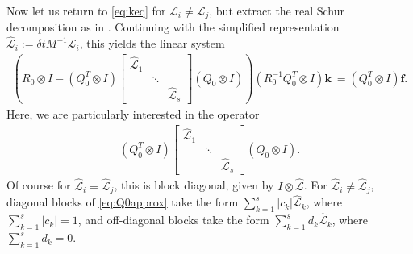 \documentclass[review]{siamart}
\begin{document}
Now let us return to \eqref{eq:keq} for $\mathcal{L}_i\neq\mathcal{L}_j$, but
extract the real Schur decomposition as in . Continuing
with the simplified representation $\widehat{\mathcal{L}}_i := \delta t M^{-1}\mathcal{L}_i$,
this yields the linear system
%
\begin{align}\label{eq:keq4}
\left( R_0\otimes I - (Q_0^T\otimes I) \begin{bmatrix}
	\widehat{\mathcal{L}}_1  & \\ & \ddots \\ && \widehat{\mathcal{L}}_s\end{bmatrix}
	(Q_0\otimes I)\right) (R_0^{-1}Q_0^T\otimes I) \mathbf{k}\
= (Q_0^T\otimes I)\mathbf{f}.
\end{align}
%
Here, we are particularly interested in the operator
%
\begin{align}\label{eq:Q0approx}
(Q_0^T\otimes I) \begin{bmatrix}
	\widehat{\mathcal{L}}_1  & \\ & \ddots \\ && \widehat{\mathcal{L}}_s\end{bmatrix}
	(Q_0\otimes I).
\end{align}
%
Of course for $\widehat{\mathcal{L}}_i = \widehat{\mathcal{L}}_j$, this is block
diagonal, given by $I\otimes\widehat{\mathcal{L}}$. For
$\widehat{\mathcal{L}}_i \neq \widehat{\mathcal{L}}_j$, diagonal blocks of
\eqref{eq:Q0approx} take the form $\sum_{k=1}^s |c_k|\widehat{\mathcal{L}}_k$,
where $\sum_{k=1}^s |c_k| = 1$, and off-diagonal blocks take the form
$\sum_{k=1}^s d_k \widehat{\mathcal{L}}_k$, where $\sum_{k=1}^s d_k = 0$.
\end{document}
